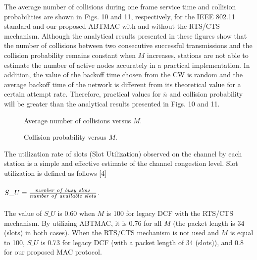 \documentclass[10pt,twocolumn,oneside,submit]{JCNtran}
\begin{document}
\par The average number of collisions during one frame service time and collision probabilities are shown in Figs. 10 and 11, respectively, for the IEEE 802.11 standard and our proposed ABTMAC with and without the RTS/CTS mechanism. Although the analytical results presented in these figures show that the number of collisions between two consecutive successful transmissions and the collision probability remains constant when $M$ increases, stations are not able to estimate the number of active nodes accurately in a practical implementation. In addition, the value of the backoff time chosen from the CW is random and the average backoff time of the network is different from its theoretical value for a certain attempt rate. Therefore, practical values for $\bar n$ and collision probability will be greater than the analytical results presented in Figs. 10 and 11.
\begin{figure}[h!tb]
\begin{center}
\epsfxsize=8cm \leavevmode{} \caption{Average number of collisions versus $M$.} \label{fig:10}
\end{center}
\end{figure}
\begin{figure}[h!tb]
\begin{center}
\epsfxsize=8cm \leavevmode{} \caption{Collision probability versus $M$.} \label{fig:11}
\end{center}
\end{figure}
\par The utilization rate of slots (Slot Utilization) observed on the channel by each station is a simple and effective estimate of the channel congestion level. Slot utilization is defined as follows [4]\\
\\
$S\_U={number\ of\ busy\ slots \over number\ of\ available\ slots}$.\\
\\
The value of $S\_U$ is 0.60 when $M$ is 100 for legacy DCF with the RTS/CTS mechanism. By utilizing ABTMAC, it is 0.76 for all $M$ (the packet length is 34 (slots) in both cases). When the RTS/CTS mechanism is not used and $M$ is equal to 100, $S\_U$ is 0.73 for legacy DCF (with a packet length of 34 (slots)), and 0.8 for our proposed MAC protocol.
\end{document}

